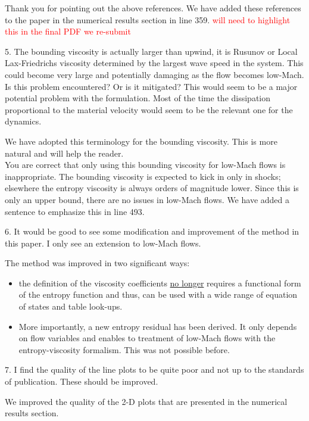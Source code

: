 \documentclass{article}
\newcommand{\tcr}[1]{\textcolor{red}{#1}}
\begin{document}
Thank you for pointing out the above references. We have added these references to the paper in the numerical results section in line 359. \tcr{will need to highlight this in the final PDF we re-submit}
\bigskip


{
\color{blue}
5. The bounding viscosity is actually larger than upwind, it is Rusunov or
Local Lax-Friedrichs viscosity determined by the largest wave speed in the
system. This could become very large and potentially damaging as the
flow becomes low-Mach. Is this problem encountered? Or is it mitigated?
This would seem to be a major potential problem with the formulation.
Most of the time the dissipation proportional to the material velocity
would seem to be the relevant one for the dynamics.
}

We have adopted this terminology for the bounding viscosity. This is more natural and
will help the reader. \\
You are correct that only using this bounding viscosity for low-Mach flows is inappropriate.  
The bounding viscosity is expected to kick in only in shocks; elsewhere the entropy viscosity is always orders of magnitude lower. Since this is only an upper bound, there are no issues in low-Mach flows. We have added a sentence to emphasize this in line 493.
\bigskip


{
\color{blue}
6. It would be good to see some modification and improvement of the
method in this paper. I only see an extension to low-Mach flows.
}

The method was improved in two significant ways: 
\begin{itemize}
\item the definition of the viscosity coefficients \underline{no longer} requires a functional form of the entropy function and thus, can be used with a wide range of equation of states and table look-ups. 
\item More importantly, a new entropy residual has been derived. It only depends on flow variables and enables to treatment of low-Mach flows with the entropy-viscosity formalism. This was not possible before.
\end{itemize}
\bigskip


{
\color{blue}
7. I find the quality of the line plots to be quite poor and not up to the
standards of publication. These should be improved.
}

We improved the quality of the 2-D plots that are presented in the numerical results section. 
\bigskip
\end{document}
